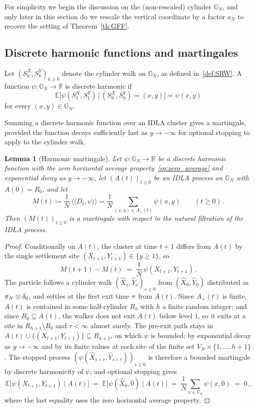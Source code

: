 \documentclass[11pt,a4paper,reqno]{amsart}
\newtheorem{Lemma}[Theorem]{Lemma}
\theoremstyle{definition}
\newcommand{\bbE}{{\ensuremath{\mathbb E}} }
\newcommand{\bbG}{{\ensuremath{\mathbb G}} }
\newcommand{\bbR}{{\ensuremath{\mathbb R}} }
\newcommand{\laa}{\langle \! \langle}
\newcommand{\raa}{\rangle \! \rangle}
\begin{document}
For simplicity we begin the discussion on the (non-rescaled) cylinder $\bbG_N$, and only later in this section do we rescale the vertical coordinate by a factor $a_N$ to recover the setting of Theorem~\ref{th:GFF}.


\subsection{Discrete harmonic functions and martingales}

Let $(S^X_k, S^Y_k)_{k\geq 0}$ denote the cylinder walk on $\bbG_N$, as defined in~\eqref{def:SRW}. A function $\psi : \bbG_N \to \bbR$ is discrete harmonic if
	\[ \bbE \big[ \psi (S^X_1, S^Y_1) \,\big|\, (S^X_0, S^Y_0) = (x, y) \big] = \psi(x, y) \]
for every $(x, y) \in \bbG_N$.

Summing a discrete harmonic function over an IDLA cluster gives a martingale, provided the function decays sufficiently fast as $y \to -\infty$ for optional stopping to apply to the cylinder walk.

\begin{Lemma}[Harmonic martingale]\label{le:martingale}
Let $\psi : \bbG_N \to \bbR$ be a discrete harmonic function with the zero horizontal average property~\eqref{eq:zero_average} and exponential decay as $y \to -\infty$, let $(A(t))_{t \geq 0}$ be an IDLA process on $\bbG_N$ with $A(0) = R_0$, and let
	\[ M(t) \coloneqq \frac{1}{N}\,\laa D_t, \psi\raa = \frac{1}{N}\sum_{(x,y) \in A_+(t)} \psi(x, y) \qquad (t \geq 0)\,. \]
Then $(M(t))_{t \geq 0}$ is a martingale with respect to the natural filtration of the IDLA process.
\end{Lemma}

\begin{proof}
Conditionally on $A(t)$, the cluster at time $t + 1$ differs from $A(t)$ by the single settlement site $(X_{t+1}, Y_{t+1}) \in \{y \geq 1\}$, so
	\[ M(t+1) - M(t) \;=\; \frac{1}{N}\,\psi(X_{t+1}, Y_{t+1})\,. \]
The particle follows a cylinder walk $(\widehat X_s, \widehat Y_s)_{s \geq 0}$ from $(\widehat X_0, \widehat Y_0)$ distributed as $\pi_N \otimes \delta_0$, and settles at the first exit time $\tau$ from $A(t)$. Since $A_+(t)$ is finite, $A(t)$ is contained in some half-cylinder $R_h$ with $h$ a finite random integer; and since $R_0 \subseteq A(t)$, the walker does not exit $A(t)$ below level $1$, so it exits at a site in $R_{h+1} \setminus R_0$ and $\tau < \infty$ almost surely. The pre-exit path stays in $A(t) \cup \{(X_{t+1}, Y_{t+1})\} \subseteq R_{h+1}$, on which $\psi$ is bounded: by exponential decay as $y \to -\infty$ and by its finite values at each site of the finite set $V_N \times \{1, \ldots, h+1\}$. The stopped process $(\psi(\widehat X_{s \wedge \tau}, \widehat Y_{s \wedge \tau}))_{s \geq 0}$ is therefore a bounded martingale by discrete harmonicity of $\psi$, and optional stopping gives
\[
  \bbE\big[ \psi(X_{t+1}, Y_{t+1}) \mid A(t) \big] \;=\; \bbE\big[\psi(\widehat X_0, 0) \mid A(t) \big] \;=\; \frac{1}{N}\sum_{x \in V_N} \psi(x, 0) \;=\; 0\,,
\]
where the last equality uses the zero horizontal average property.
\end{proof}
\end{document}
